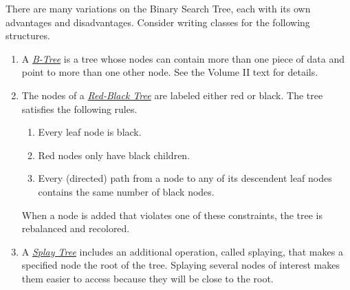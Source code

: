 There are many variations on the Binary Search Tree, each with its own advantages and disadvantages.
Consider writing classes for the following structures.
%
\begin{enumerate}
\item A \href{https://en.wikipedia.org/wiki/B-tree}{\emph{B-Tree}} is a tree whose nodes can contain more than one piece of data and point to more than one other node.
See the Volume II text for details.
\item The nodes of a \href{https://en.wikipedia.org/wiki/Red%E2%80%93black_tree}{\emph{Red-Black Tree}} are labeled either red or black.
The tree satisfies the following rules.
\begin{enumerate}
    \item Every leaf node is black.
    \item Red nodes only have black children.
    \item Every (directed) path from a node to any of its descendent leaf nodes contains the same number of black nodes.
\end{enumerate}
When a node is added that violates one of these constraints, the tree is rebalanced and recolored.
\item A \href{https://en.wikipedia.org/wiki/Splay_tree}{\emph{Splay Tree}} includes an additional operation, called splaying, that makes a specified node the root of the tree.
Splaying several nodes of interest makes them easier to access because they will be close to the root.
\end{enumerate}

